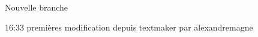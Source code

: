 \documentclass[11pt]{article}
\begin{document}
Nouvelle branche

16:33 premières modification depuis textmaker par alexandremagne
\end{document}
